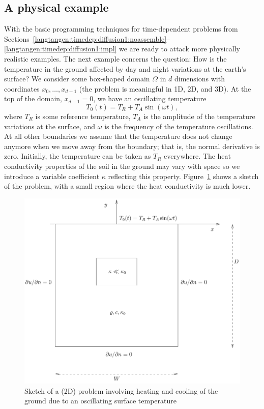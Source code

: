 \subsection{A physical example}
\label{langtangen:timedep:diffusion2:sin}

With the basic programming techniques for time-dependent problems from
Sections~\ref{langtangen:timedep:diffusion1:noassemble}--\ref{langtangen:timedep:diffusion1:impl}
we are ready to attack more physically realistic examples.  The next
example concerns the question: How is the temperature in the ground
affected by day and night variations at the earth's surface?  We consider
some box-shaped domain $\Omega$ in $d$ dimensions with coordinates
$x_0,\ldots,x_{d-1}$ (the problem is meaningful in 1D, 2D, and 3D).
At the top of the domain, $x_{d-1}=0$, we have an oscillating temperature
\begin{equation}
  T_0(t) = T_R + T_A\sin (\omega t),
\end{equation}
where $T_R$ is some reference temperature, $T_A$ is the amplitude
of the temperature variations at the surface, and $\omega$ is the
frequency of the temperature oscillations.  At all other boundaries
we assume that the temperature does not change anymore when we
move away from the boundary; that is, the normal derivative is zero.
Initially, the temperature can be taken as $T_R$ everywhere.  The heat
conductivity properties of the soil in the ground may vary with space so
we introduce a variable coefficient $\kappa$ reflecting this property.
Figure~\ref{langtangen:timedep:diffusion2:sin:fig1} shows a sketch of the
problem, with a small region where the heat conductivity is much lower.
\begin{figure}
  \centering
  \includegraphics[width=\largefig]{chapters/langtangen/pdf/daynight.pdf}
  \caption{Sketch of a (2D) problem involving heating and cooling of
    the ground due to an oscillating surface temperature}
  \label{langtangen:timedep:diffusion2:sin:fig1}
\end{figure}

